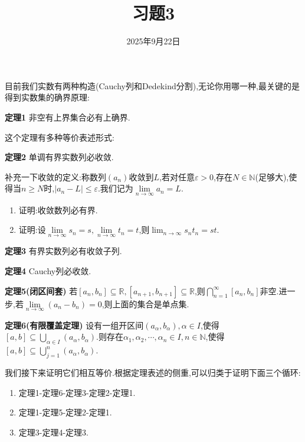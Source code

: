 \documentclass[
  a4paper,
]{ctexart}
\title{习题3}
\author{}
\date{2025年9月22日}
\providecommand{\tightlist}{\setlength{\itemsep}{0pt}\setlength{\parskip}{0pt}}
\begin{document}
%
\pagestyle{fancy}
\fancyhf{}


\renewcommand{\headrulewidth}{1pt}
\rfoot{\thepage}

目前我们实数有两种构造(Cauchy列和Dedekind分割),无论你用哪一种,最关键的是得到实数集的确界原理:

\textbf{定理1} 非空有上界集合必有上确界.

这个定理有多种等价表述形式:

\textbf{定理2} 单调有界实数列必收敛.

补充一下收敛的定义:称数列\((a_n)\)收敛到\(L\),若对任意\(\varepsilon > 0\),存在\(N \in \mathbb{N}\)(足够大),使得当\(n \geq N\)时,\(\vert a_n - L \rvert \leq \varepsilon\).我们记为\(\lim\limits_{n \to \infty}a_n=L\).

\begin{enumerate}
\def\labelenumi{\arabic{enumi}.}
\tightlist
\item
  证明:收敛数列必有界.
\item
  证明:设\(\lim\limits_{n \to \infty}s_n=s,\lim\limits_{n \to \infty}t_n=t\),则\(\lim_{n \to \infty}s_nt_n=st\).
\end{enumerate}

\textbf{定理3} 有界实数列必有收敛子列.

\textbf{定理4} Cauchy列必收敛.

\textbf{定理5(闭区间套)}
若\([a_n,b_n] \subseteq \mathbb{R},[a_{n+1},b_{n+1}] \subseteq \mathbb{R}\),则\(\bigcap\limits_{n=1}^\infty[a_n,b_n]\)非空.进一步,若\(\lim\limits_{n \to \infty}\left( a_n-b_n \right)=0\),则上面的集合是单点集.

\textbf{定理6(有限覆盖定理)}
设有一组开区间\(\left( a_\alpha,b_\alpha \right),\alpha \in I\),使得\([a,b]\subseteq\bigcup\limits_{\alpha \in I}\left( a_\alpha,b_\alpha \right)\).则存在\(\alpha_1,\alpha_2,\cdots,\alpha_n \in I,n \in \mathbb{N}\),使得\([a,b] \subseteq \bigcup\limits_{j=1}^n\left( a_\alpha,b_\alpha \right)\).

我们接下来证明它们相互等价.根据定理表述的侧重,可以归类于证明下面三个循环:

\begin{enumerate}
\def\labelenumi{\arabic{enumi}.}
\setcounter{enumi}{2}
\tightlist
\item
  定理1-定理6-定理3-定理2-定理1.
\item
  定理1-定理5-定理2-定理1.
\item
  定理3-定理4-定理3.
\end{enumerate}
\end{document}
